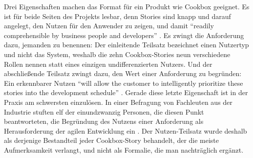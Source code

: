 %
%
%
%
%
Drei Eigenschaften machen das Format für ein Produkt wie Cookbox geeignet. Es ist
für beide Seiten des Projekts lesbar, denn Stories sind knapp und darauf angelegt,
den Nutzen für den Anwender zu zeigen, und damit \enquote{readily comprehensible
by business people and developers} \parencite[p.~148]{cohn2004}. Es zwingt die Anforderung
dazu, jemanden zu benennen: Der einleitende Teilsatz bezeichnet einen Nutzertyp
und nicht das System, weshalb die zehn Cookbox-Stories neun verschiedene Rollen
nennen statt eines einzigen undifferenzierten Nutzers. Und der abschließende
Teilsatz zwingt dazu, den Wert einer Anforderung zu begründen: Ein erkennbarer
Nutzen \enquote{will allow the customer to intelligently prioritize
these stories into the development schedule} \parencite[p.~21]{cohn2004}. Gerade
diese letzte Eigenschaft ist in der Praxis am schwersten einzulösen. In einer
Befragung von Fachleuten aus der Industrie stuften elf der einundzwanzig
Personen, die diesen Punkt beantworteten, die Begründung des Nutzens einer
Anforderung als Herausforderung der agilen Entwicklung ein
\parencite[p.~49]{schoen2017}. Der Nutzen-Teilsatz wurde deshalb als derjenige
Bestandteil jeder Cookbox-Story behandelt, der die meiste Aufmerksamkeit
verlangt, und nicht als Formalie, die man nachträglich ergänzt.


